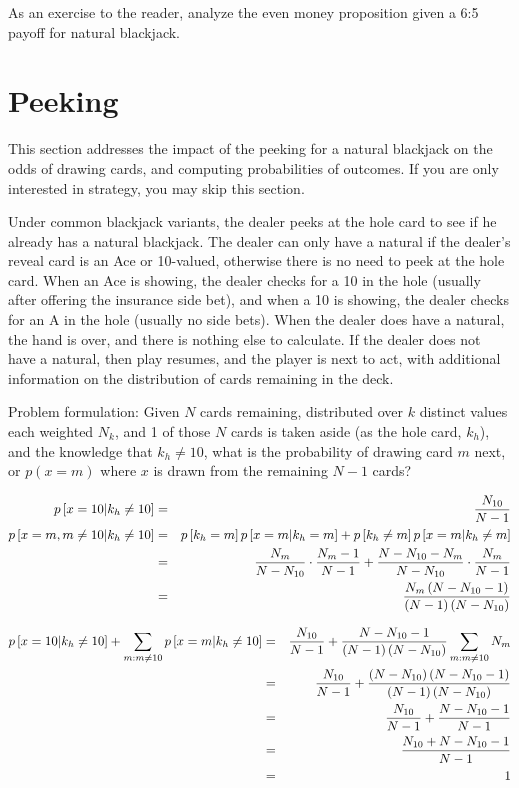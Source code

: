 As an exercise to the reader, analyze the even money proposition
given a 6:5 payoff for natural blackjack.

\section{Peeking}
\label{sec:basic:peeking}

This section addresses the impact of the peeking for a natural blackjack
on the odds of drawing cards, and computing probabilities of outcomes.
If you are only interested in strategy, you may skip this section.  

Under common blackjack variants, the dealer peeks at the hole card
to see if he already has a natural blackjack.
The dealer can only have a natural if the dealer's reveal card is an 
Ace or 10-valued, otherwise there is no need to peek at the hole card.
When an Ace is showing, the dealer checks for a 10 in the hole (usually 
after offering the insurance side bet), and when a 10 is showing, 
the dealer checks for an A in the hole (usually no side bets).
When the dealer does have a natural, the hand is over, 
and there is nothing else to calculate.
If the dealer does not have a natural, then play resumes, 
and the player is next to act, with additional information on the
distribution of cards remaining in the deck.

\noindent
Problem formulation:
Given $N$ cards remaining, distributed over $k$ distinct values 
each weighted $N_k$, and 1 of those $N$ cards is taken aside 
(as the hole card, $k_h$), and the knowledge that $k_h\neq{}10$, 
what is the probability of drawing card $m$ next, 
or $p(x=m)$ where $x$ is drawn from the remaining $N-1$ cards?

\begin{eqnarray}
p\left[x=10|k_h\neq{}10\right] &=& \frac{N_{10}}{N-1}\\
p\left[x=m,m\neq{}10|k_h\neq{}10\right] &=&
  p\left[k_h=m\right] p\left[x=m|k_h=m\right]
  +p\left[k_h\neq{}m\right] p\left[x=m|k_h\neq{}m\right]\\
&=& \frac{N_m}{N-N_{10}}\cdot\frac{N_m-1}{N-1}
  +\frac{N-N_{10}-N_m}{N-N_{10}}\cdot\frac{N_m}{N-1}\\
&=& \frac{N_m\left(N-N_{10}-1\right)}{\left(N-1\right)\left(N-N_{10}\right)}
\end{eqnarray}

\begin{eqnarray}
p\left[x=10|k_h\neq{}10\right] +\sum_{m:m\neq{}10}^{}{p\left[x=m|k_h\neq{}10\right]} &=&
  \frac{N_{10}}{N-1}
  +\frac{N-N_{10}-1}{\left(N-1\right)\left(N-N_{10}\right)} \sum_{m:m\neq{}10}^{}{N_m}\\
&=& \frac{N_{10}}{N-1} +\frac{\left(N-N_{10}\right)\left(N-N_{10}-1\right)}{\left(N-1\right)\left(N-N_{10}\right)}\\
&=& \frac{N_{10}}{N-1} +\frac{N-N_{10}-1}{N-1}\\
&=& \frac{N_{10}+N-N_{10}-1}{N-1}\\
&=& 1
\end{eqnarray}

